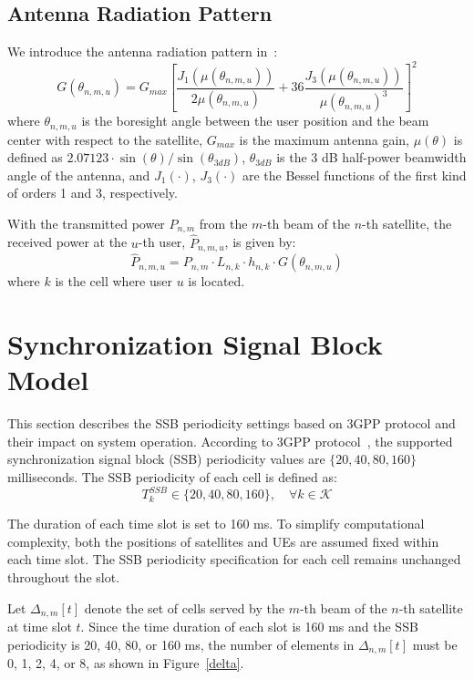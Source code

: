 \subsection{Antenna Radiation Pattern}
We introduce the antenna radiation pattern in~\cite{Energy-Efficient}:
\begin{equation}
    G(\theta_{n,m,u}) = G_{max} \left[ \frac{J_1\left(\mu(\theta_{n,m,u})\right)}{2\mu(\theta_{n,m,u})}
    + 36 \frac{J_3\left(\mu(\theta_{n,m,u})\right)}{\mu(\theta_{n,m,u})^3} \right]^2
\end{equation}
where $\theta_{n,m,u}$ is the boresight angle between the user position and the beam center with respect to the satellite, $G_{max}$ is the maximum antenna gain, $\mu(\theta)$ is defined as $2.07123 \cdot \sin(\theta)/\sin(\theta_{3dB})$, $\theta_{3dB}$ is the 3 dB half-power beamwidth angle of the antenna, and $J_1(\cdot)$, $J_3(\cdot)$ are the Bessel functions of the first kind of orders 1 and 3, respectively.

With the transmitted power $P_{n,m}$ from the $m$-th beam of the $n$-th satellite, the received power at the $u$-th user, $\hat{P}_{n,m,u}$, is given by:
\begin{equation}
    \hat{P}_{n,m,u} = P_{n,m} \cdot L_{n,k} \cdot h_{n,k} \cdot G(\theta_{n,m,u})
\end{equation}
where $k$ is the cell where user $u$ is located.

\section{Synchronization Signal Block Model}
This section describes the SSB periodicity settings based on 3GPP protocol and their impact on system operation. According to 3GPP protocol~\cite{38331}, the supported synchronization signal block (SSB) periodicity values are $\{20, 40, 80, 160\}$ milliseconds. The SSB periodicity of each cell is defined as:
\begin{equation}
    T^{SSB}_{k} \in \{20, 40, 80, 160\}, \quad \forall k \in \mathcal{K}
\end{equation}

The duration of each time slot is set to 160 ms. To simplify computational complexity, both the positions of satellites and UEs are assumed fixed within each time slot. The SSB periodicity specification for each cell remains unchanged throughout the slot.

Let $\Delta_{n,m}[t]$ denote the set of cells served by the $m$-th beam of the $n$-th satellite at time slot $t$. Since the time duration of each slot is 160 ms and the SSB periodicity is 20, 40, 80, or 160 ms, the number of elements in $\Delta_{n,m}[t]$ must be 0, 1, 2, 4, or 8, as shown in Figure~\ref{delta}.

